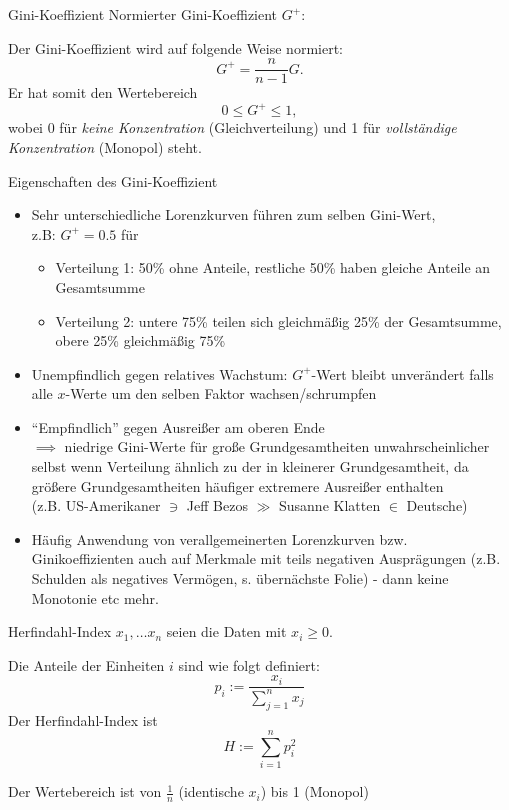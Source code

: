 \documentclass[
  10pt,
  ignorenonframetext,
]{beamer}
\providecommand{\tightlist}{%
  \setlength{\itemsep}{0pt}\setlength{\parskip}{0pt}}
\begin{document}
\begin{frame}{Gini-Koeffizient}
\label{gini-koeffizient-2}
Normierter Gini-Koeffizient \(G^{+}\):

Der Gini-Koeffizient wird auf folgende Weise normiert: \[
      G^{+} = \frac{n}{n - 1} G.
  \] Er hat somit den Wertebereich \[
      0 \leq G^{+} \leq 1,
  \] wobei 0 für \textit{keine Konzentration} (Gleichverteilung) und 1
für \textit{vollständige Konzentration} (Monopol) steht.
\end{frame}

\begin{frame}{Eigenschaften des Gini-Koeffizient}
\label{eigenschaften-des-gini-koeffizient}
\begin{itemize}
\item
  Sehr unterschiedliche Lorenzkurven führen zum selben Gini-Wert,\\
  z.B: \(G^{+} = 0.5\) für

  \begin{itemize}
  \tightlist
  \item
    Verteilung 1: 50\% ohne Anteile, restliche 50\% haben gleiche
    Anteile an Gesamtsumme
  \item
    Verteilung 2: untere 75\% teilen sich gleichmäßig 25\% der
    Gesamtsumme, obere 25\% gleichmäßig 75\%
  \end{itemize}
\item
  Unempfindlich gegen relatives Wachstum: \(G^{+}\)-Wert bleibt
  unverändert falls alle \(x\)-Werte um den selben Faktor
  wachsen/schrumpfen
\item
  ``Empfindlich'' gegen Ausreißer am oberen Ende\\
  \(\implies\) niedrige Gini-Werte für große Grundgesamtheiten
  unwahrscheinlicher selbst wenn Verteilung ähnlich zu der in kleinerer
  Grundgesamtheit, da größere Grundgesamtheiten häufiger extremere
  Ausreißer enthalten\\
  (z.B. US-Amerikaner \(\ni\) Jeff Bezos \(\gg\) Susanne Klatten \(\in\)
  Deutsche)
\item
  Häufig Anwendung von verallgemeinerten Lorenzkurven bzw.
  Ginikoeffizienten auch auf Merkmale mit teils negativen Ausprägungen
  (z.B. Schulden als negatives Vermögen, s. übernächste Folie) - dann
  keine Monotonie etc mehr.
\end{itemize}
\end{frame}

\begin{frame}{Herfindahl-Index}
\label{herfindahl-index}
\(x_1,\ldots x_n\) seien die Daten mit \(x_i \ge 0\).

Die Anteile der Einheiten \(i\) sind wie folgt definiert:
\[ p_i := \frac{x_i}{\sum_{j=1}^n x_j} \] Der Herfindahl-Index ist
\[ H := \sum_{i=1}^n p_i^2 \]

Der Wertebereich ist von \(\frac{1}{n}\) (identische \(x_i\)) bis 1
(Monopol)
\end{frame}
\end{document}
